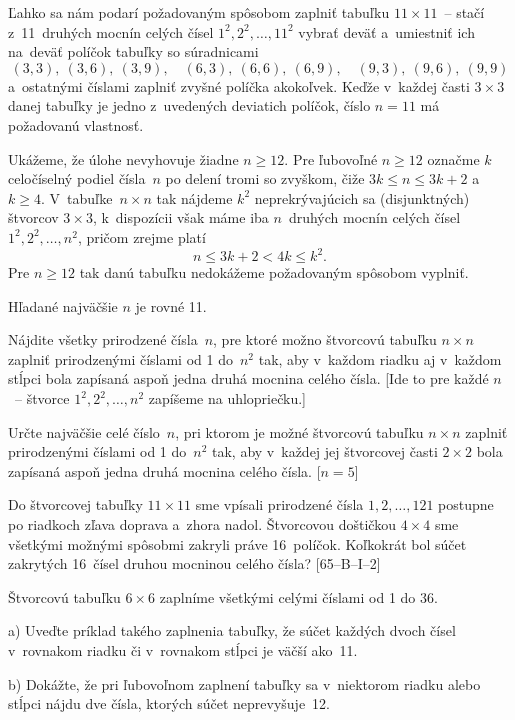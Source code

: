 {%
Ľahko sa nám podarí požadovaným spôsobom zaplniť tabuľku $11 \times11$~--
stačí z~11~druhých mocnín celých čísel $1^2, 2^2, \dots, 11^2$ vybrať deväť
a~umiestniť ich na~deväť políčok tabuľky so súradnicami
$$
(3,3), \ (3,6), \ (3,9), \quad
(6,3), \ (6,6), \ (6,9), \quad
(9,3), \ (9,6), \ (9,9)
$$
a~ostatnými číslami zaplniť zvyšné políčka akokoľvek. Keďže
v~každej časti $3 \times3$ danej tabuľky je jedno z~uvedených deviatich
políčok, číslo $n = 11$ má požadovanú vlastnosť.

Ukážeme, že úlohe nevyhovuje žiadne $n\ge12$.
Pre ľubovoľné $n \ge 12$ označme $k$ celočíselný podiel čísla~$n$
po delení tromi so zvyškom, čiže $3k\le n\le3k+2$ a~${k\ge4}$.
V~tabuľke~$n\times n$
tak nájdeme $k^2$ neprekrývajúcich sa (disjunktných) štvorcov
$3 \times3$, k~dispozícii však máme iba $n$~druhých mocnín celých čísel
$1^2, 2^2, \dots, n^2$, pričom zrejme platí
$$
n\le3k+2<4k\le k^2.
$$
Pre $n\ge12$ tak danú tabuľku nedokážeme požadovaným spôsobom vyplniť.

\odpoved
Hľadané najväčšie $n$ je rovné 11.

Nájdite všetky prirodzené čísla~$n$, pre ktoré možno štvorcovú
tabuľku $n \times n$ zaplniť prirodzenými číslami od 1 do~$n^2$ tak, aby
v~každom riadku aj v~každom stĺpci bola zapísaná aspoň jedna druhá
mocnina celého čísla. [Ide to pre každé $n$~-- štvorce $1^2, 2^2,
\dots, n^2$ zapíšeme na uhlopriečku.]

Určte najväčšie celé číslo~$n$, pri ktorom je možné štvorcovú tabuľku
$n\times n$ zaplniť prirodzenými číslami od 1 do~$n^2$ tak, aby
v~každej jej štvorcovej časti $2 \times2$ bola zapísaná aspoň jedna
druhá mocnina celého čísla. [$n = 5$]

\D
Do štvorcovej tabuľky $11 \times 11$ sme vpísali prirodzené čísla
$1, 2, \dots, 121$ postupne po riadkoch zľava doprava a~zhora nadol. Štvorcovou
doštičkou $4 \times 4$ sme všetkými možnými spôsobmi zakryli práve 16~políčok.
Koľkokrát bol súčet zakrytých 16~čísel druhou mocninou celého čísla?
[65--B--I--2]

Štvorcovú tabuľku $6\times 6$ zaplníme všetkými celými číslami od
1 do 36.
\item{a)} Uveďte príklad takého zaplnenia tabuľky, že súčet každých
dvoch čísel v~rovnakom riadku či v~rovnakom stĺpci je väčší ako~11.
\item{b)} Dokážte, že pri ľubovoľnom zaplnení tabuľky sa v~niektorom riadku alebo stĺpci nájdu
dve čísla, ktorých súčet neprevyšuje~12.\endgraf
[66--C--II--2]
}

